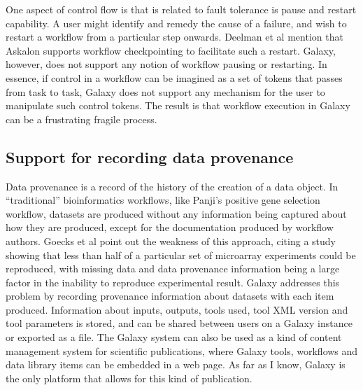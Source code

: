 \documentclass[a4paper,10pt]{scrreprt}
\begin{document}
One aspect of control flow is that is related to fault tolerance is pause and restart capability. A user might identify and remedy the cause of a failure, and wish to restart a workflow from a particular step onwards. Deelman et al mention that Askalon supports workflow checkpointing to facilitate such a restart. Galaxy, however, does not support any notion of workflow pausing or restarting. In essence, if control in a workflow can be imagined as a set of tokens that passes from task to task, Galaxy does not support any mechanism for the user to manipulate such control tokens. The result is that workflow execution in Galaxy can be a frustrating fragile process.

\subsection{Support for recording data provenance}

Data provenance is a record of the history of the creation of a data object. In ``traditional'' bioinformatics workflows, like Panji's positive gene selection workflow, datasets are produced without any information being captured about how they are produced, except for the documentation produced by workflow authors. Goecks et al point out the weakness of this approach, citing a study showing that less than half of a particular set of microarray experiments could be reproduced, with missing data and data provenance information being a large factor in the inability to reproduce experimental result. Galaxy addresses this problem by recording provenance information about datasets with each item produced. Information about inputs, outputs, tools used, tool XML version and tool parameters is stored, and can be shared between users on a Galaxy instance or exported as a file. The Galaxy system can also be used as a kind of content management system for scientific publications, where Galaxy tools, workflows and data 
library items can be embedded in a web page. As far as I know, Galaxy is the only platform that allows for this kind of publication.
\end{document}
